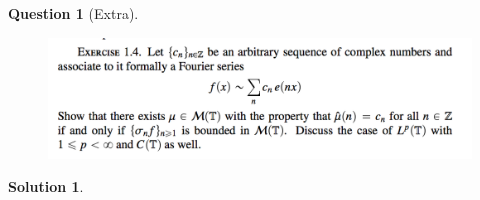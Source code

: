 \documentclass{article} %
\theoremstyle{quest}
\newtheorem*{question}{Question}
\newtheorem*{solution}{Solution}
\begin{document}
\begin{question}[Extra]
\hfill
\begin{figure}[h!]
  \centering
    \includegraphics[width=1\textwidth]{HA-1-Extra.png}
\end{figure}
\end{question}
\begin{solution}
\end{solution}
\end{document}
